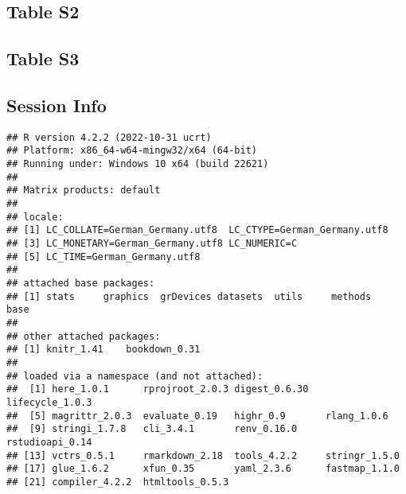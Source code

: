 \documentclass[
]{article}
\begin{document}
\newpage

\hypertarget{table-s2}{%
\subsection*{Table S2}\label{table-s2}}

\clearpage

\newpage

\hypertarget{table-s3}{%
\subsection*{Table S3}\label{table-s3}}

\clearpage

\newpage

\hypertarget{session-info}{%
\subsection*{Session Info}\label{session-info}}

\begin{verbatim}
## R version 4.2.2 (2022-10-31 ucrt)
## Platform: x86_64-w64-mingw32/x64 (64-bit)
## Running under: Windows 10 x64 (build 22621)
## 
## Matrix products: default
## 
## locale:
## [1] LC_COLLATE=German_Germany.utf8  LC_CTYPE=German_Germany.utf8   
## [3] LC_MONETARY=German_Germany.utf8 LC_NUMERIC=C                   
## [5] LC_TIME=German_Germany.utf8    
## 
## attached base packages:
## [1] stats     graphics  grDevices datasets  utils     methods   base     
## 
## other attached packages:
## [1] knitr_1.41    bookdown_0.31
## 
## loaded via a namespace (and not attached):
##  [1] here_1.0.1      rprojroot_2.0.3 digest_0.6.30   lifecycle_1.0.3
##  [5] magrittr_2.0.3  evaluate_0.19   highr_0.9       rlang_1.0.6    
##  [9] stringi_1.7.8   cli_3.4.1       renv_0.16.0     rstudioapi_0.14
## [13] vctrs_0.5.1     rmarkdown_2.18  tools_4.2.2     stringr_1.5.0  
## [17] glue_1.6.2      xfun_0.35       yaml_2.3.6      fastmap_1.1.0  
## [21] compiler_4.2.2  htmltools_0.5.3
\end{verbatim}
\end{document}
